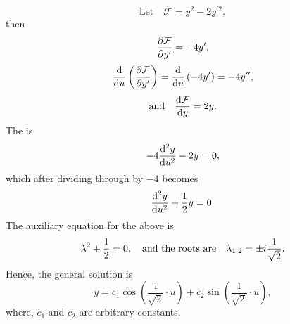 \def\F{\mathcal{F\xspace}}
\def\L{\left(}
\def\R{\right)}
\def\osu{\L\frac{1}{\sqrt{2}}\cdot u\R}
\[
	\textrm{Let}\quad \F = y^2 - 2y^{\prime2},
\]
then
\[
	\pderiv{\F}{y^\prime} = -4 y^\prime,
\]
\[
	\deriv{}{u}\L\pderiv{\F}{y^\prime}\R = \deriv{}{u}\L-4 y^\prime\R = -4 y^\dprime,
\]
\[
	\textrm{and}\quad \deriv{\F}{y} = 2 y.
\]
The \el is
\[
	-4\frac{\mathrm{d}^2y}{\mathrm{d}u^2} - 2y = 0,
\]
which after dividing through by $-4$ becomes
\[
	\frac{\mathrm{d}^2y}{\mathrm{d}u^2} +\frac{1}{2} y = 0.
\]
The auxiliary equation for the above \el is
\[
	\lambda^2 + \frac{1}{2} = 0, \quad \textrm{and the roots are} \quad \lambda_{1,2} = \pm i\frac{1}{\sqrt{2}}.
\]
Hence, the general solution is
\begin{equation}
\label{eq:1.1}
	y = c_1\cos\osu + c_2\sin\osu,
\end{equation}
where, $c_1$ and $c_2$ are arbitrary constants.